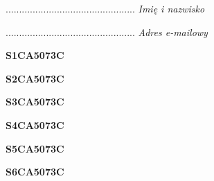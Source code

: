 \begin{turn}{90}\begin{minipage}{\linewidth} \vspace{20mm} ................................................  \textit{Imię i nazwisko}\end{minipage}\end{turn}

\begin{turn}{90}\begin{minipage}{\linewidth} \vspace{20mm} ................................................  \textit{Adres e-mailowy}\end{minipage}\end{turn}

\begin{turn}{90}\huge \begin{minipage}{\linewidth} \vspace{10mm}\textbf{S1CA5073C}\end{minipage}\end{turn}

\begin{turn}{90}\huge \begin{minipage}{\linewidth} \vspace{10mm}\textbf{S2CA5073C}\end{minipage}\end{turn}

\begin{turn}{90}\huge \begin{minipage}{\linewidth} \vspace{10mm}\textbf{S3CA5073C}\end{minipage}\end{turn}

\begin{turn}{90}\huge \begin{minipage}{\linewidth} \vspace{10mm}\textbf{S4CA5073C}\end{minipage}\end{turn}

\begin{turn}{90}\huge \begin{minipage}{\linewidth} \vspace{10mm}\textbf{S5CA5073C}\end{minipage}\end{turn}

\begin{turn}{90}\huge \begin{minipage}{\linewidth} \vspace{10mm}\textbf{S6CA5073C}\end{minipage}\end{turn}

